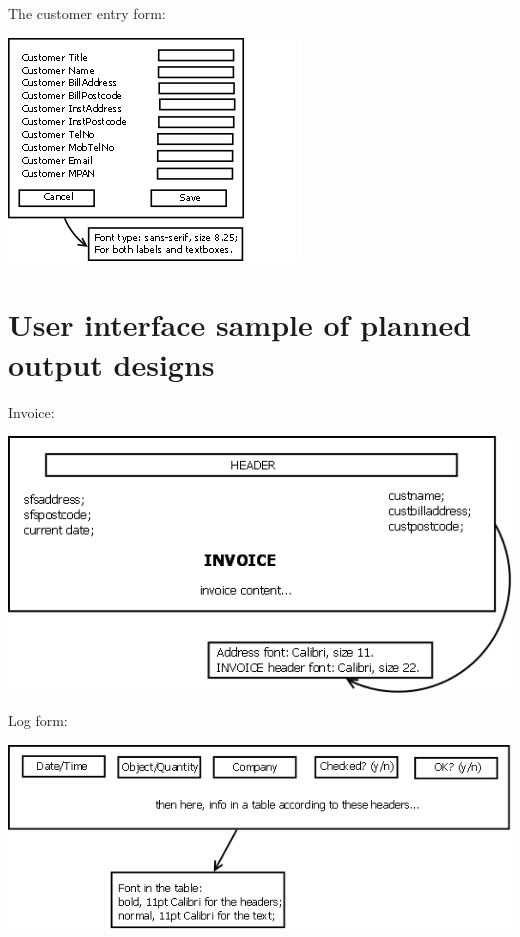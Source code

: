 The customer entry form:

\begin{center}\includegraphics{custentrydesignoriginal.png}\end{center}
	\section{User interface sample of planned output designs}
Invoice:

\begin{center}\includegraphics[scale=0.5]{invoicedesignoriginal.png}\end{center}

Log form:

\begin{center}\includegraphics[scale=0.5]{logdesignoriginal.png}\end{center}

